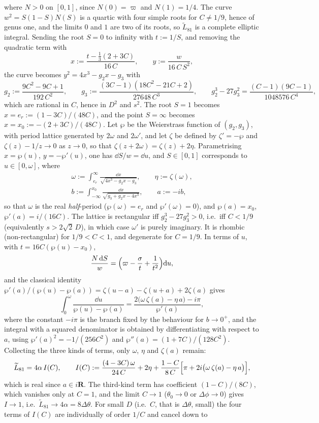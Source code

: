 where $N>0$ on $[0,1]$, since $N(0)=\varpi$ and $N(1)=1/4$. The curve $w^2=S(1-S)N(S)$ is a quartic with four simple roots for $C\ne1/9$, hence of genus one, and the limits $0$ and $1$ are two of its roots, so $\widetilde L_{81}$ is a complete elliptic integral. Sending the root $S=0$ to infinity with $t:=1/S$, and removing the quadratic term with
$$x:=\frac{t-\tfrac13(2+3C)}{16\,C},\qquad y:=\frac{w}{16\,C\,S^2},$$
the curve becomes $y^2=4x^3-g_2x-g_3$ with
$$g_2:=\frac{9C^2-9C+1}{192\,C^2},\qquad g_3:=\frac{(3C-1)(18C^2-21C+2)}{27648\,C^3},\qquad g_2^3-27g_3^2=\frac{(C-1)(9C-1)}{1048576\,C^4},$$
which are rational in $C$, hence in $D^2$ and $s^2$. The root $S=1$ becomes $x=e_r:=(1-3C)/(48C)$, and the point $S=\infty$ becomes $x=x_0:=-(2+3C)/(48C)$. Let $\wp$ be the Weierstrass function of $(g_2,g_3)$, with period lattice generated by $2\omega$ and $2\omega'$, and let $\zeta$ be defined by $\zeta'=-\wp$ and $\zeta(z)-1/z\to0$ as $z\to0$, so that $\zeta(z+2\omega)=\zeta(z)+2\eta$. Parametrising $x=\wp(u)$, $y=-\wp'(u)$, one has $\dd S/w=\dd u$, and $S\in[0,1]$ corresponds to $u\in[0,\omega]$, where
$$\begin{gathered}\omega:=\int_{e_r}^{\infty}\frac{\dd x}{\sqrt{4x^3-g_2x-g_3}},\qquad \eta:=\zeta(\omega),\\ b:=\int_{-\infty}^{x_0}\frac{\dd x}{\sqrt{g_3+g_2x-4x^3}},\qquad a:=-ib,\end{gathered}$$
so that $\omega$ is the real \emph{half}-period ($\wp(\omega)=e_r$ and $\wp'(\omega)=0$), and $\wp(a)=x_0$, $\wp'(a)=i/(16C)$. The lattice is rectangular iff $g_2^3-27g_3^2>0$, i.e.\ iff $C<1/9$ (equivalently $s>2\sqrt2\,D$), in which case $\omega'$ is purely imaginary. It is rhombic (non-rectangular) for $1/9<C<1$, and degenerate for $C=1/9$. In terms of $u$, with $t=16C(\wp(u)-x_0)$,
$$\frac{N\,\dd S}{w}=\Bigl(\varpi-\frac{\sigma}{t}+\frac1{t^2}\Bigr)\dd u,$$
and the classical identity $\wp'(a)/(\wp(u)-\wp(a))=\zeta(u-a)-\zeta(u+a)+2\zeta(a)$ gives
$$\int_0^\omega\frac{\dd u}{\wp(u)-\wp(a)}=\frac{2\bigl(\omega\,\zeta(a)-\eta\,a\bigr)-i\pi}{\wp'(a)},$$
where the constant $-i\pi$ is the branch fixed by the behaviour for $b\to0^+$, and the integral with a squared denominator is obtained by differentiating with respect to $a$, using $\wp'(a)^2=-1/(256C^2)$ and $\wp''(a)=(1+7C)/(128C^2)$. Collecting the three kinds of terms, only $\omega$, $\eta$ and $\zeta(a)$ remain:
$$\widetilde L_{81}=4\alpha\,I(C),\qquad I(C):=\frac{(4-3C)\,\omega}{24\,C}+2\eta+\frac{1-C}{8\,C}\Bigl[\pi+2i\bigl(\omega\,\zeta(a)-\eta\,a\bigr)\Bigr],$$
which is real since $a\in i\mathbf{R}$. The third-kind term has coefficient $(1-C)/(8C)$, which vanishes only at $C=1$, and the limit $C\to1$ ($\theta_0\to0$ or $\Delta\phi\to0$) gives $I\to1$, i.e.\ $\widetilde L_{81}\to4\alpha=8\Delta\theta$. For small $D$ (i.e.\ $C$, that is $\Delta\theta$, small) the four terms of $I(C)$ are individually of order $1/C$ and cancel down to
